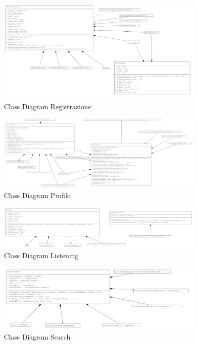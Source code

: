 \documentclass{article}
\begin{document}
			\begin{figure}[H]
				\centering
				\includegraphics[width=0.9\textwidth]{Immagini/classdiagramregistrazione}
				\caption{Class Diagram Registrazione}
			\end{figure}
			\vspace{0.9cm}
			\begin{figure}[H]
				\centering
				\includegraphics[width=0.9\textwidth]{Immagini/classdiagramprofilo}
				\caption{Class Diagram Profilo}
			\end{figure}
			\vspace{0.9cm}
			\begin{figure}[H]
				\centering
				\includegraphics[width=0.9\textwidth]{Immagini/classdiagramlistening}
				\caption{Class Diagram Listening}
			\end{figure}
			\vspace{0.9cm}
			\begin{figure}[H]
				\centering
				\includegraphics[width=0.9\textwidth]{Immagini/classdiagramsearch}
				\caption{Class Diagram Search}
			\end{figure}
\end{document}
